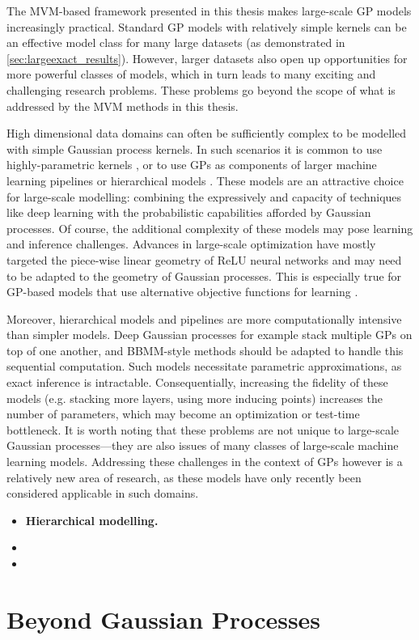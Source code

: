 The MVM-based framework presented in this thesis makes large-scale GP models increasingly practical.
Standard GP models with relatively simple kernels can be an effective model class for many large datasets (as demonstrated in \cref{sec:largeexact_results}).
However, larger datasets also open up opportunities for more powerful classes of models, which in turn leads to many exciting and challenging research problems.
These problems go beyond the scope of what is addressed by the MVM methods in this thesis.

High dimensional data domains can often be sufficiently complex to be modelled with simple Gaussian process kernels.
In such scenarios it is common to use highly-parametric kernels \cite{wilson2013gaussian,wilson2016stochastic},
or to use GPs as components of larger machine learning pipelines \cite{schulam2015framework,futoma2017learning} or hierarchical models \cite{wilson2012gaussian,salimbeni2017doubly,jankowiak2020deep}.
These models are an attractive choice for large-scale modelling: combining the expressively and capacity of techniques like deep learning with the probabilistic capabilities afforded by Gaussian processes.
Of course, the additional complexity of these models may pose learning and inference challenges.
Advances in large-scale optimization have mostly targeted the piece-wise linear geometry of ReLU neural networks  and may need to be adapted to the geometry of Gaussian processes.
This is especially true for GP-based models that use alternative objective functions for learning \cite{jankowiak2020parametric} .

Moreover, hierarchical models and pipelines are more computationally intensive than simpler models.
Deep Gaussian processes for example stack multiple GPs on top of one another, and BBMM-style methods should be adapted to handle this sequential computation.
Such models necessitate parametric approximations, as exact inference is intractable.
Consequentially, increasing the fidelity of these models (e.g. stacking more layers, using more inducing points) increases the number of parameters, which may become an optimization or test-time bottleneck.
It is worth noting that these problems are not unique to large-scale Gaussian processes---they are also issues of many classes of large-scale machine learning models.
Addressing these challenges in the context of GPs however is a relatively new area of research, as these models have only recently been considered applicable in such domains.

%
\begin{itemize}
  \item {\bf Hierarchical modelling.}

  \item

  \item
\end{itemize}



\section{Beyond Gaussian Processes}

